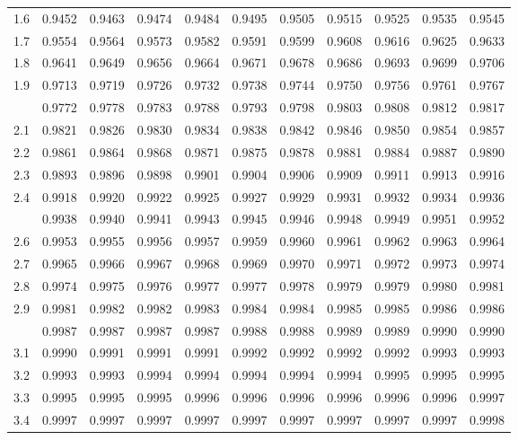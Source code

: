 \documentclass[12pt,a4paper]{article}
\begin{document}
\begin{enumerate}
\begin{center}
\begin{longtable}{ccccccccccc}
1.6 & 0.9452 & 0.9463 & 0.9474 & 0.9484 & 0.9495 & 0.9505 & 0.9515 & 0.9525 & 0.9535 & 0.9545 \\
1.7 & 0.9554 & 0.9564 & 0.9573 & 0.9582 & 0.9591 & 0.9599 & 0.9608 & 0.9616 & 0.9625 & 0.9633 \\
1.8 & 0.9641 & 0.9649 & 0.9656 & 0.9664 & 0.9671 & 0.9678 & 0.9686 & 0.9693 & 0.9699 & 0.9706 \\
1.9 & 0.9713 & 0.9719 & 0.9726 & 0.9732 & 0.9738 & 0.9744 & 0.9750 & 0.9756 & 0.9761 & 0.9767 \\
\addlinespace
2.0 & 0.9772 & 0.9778 & 0.9783 & 0.9788 & 0.9793 & 0.9798 & 0.9803 & 0.9808 & 0.9812 & 0.9817 \\
2.1 & 0.9821 & 0.9826 & 0.9830 & 0.9834 & 0.9838 & 0.9842 & 0.9846 & 0.9850 & 0.9854 & 0.9857 \\
2.2 & 0.9861 & 0.9864 & 0.9868 & 0.9871 & 0.9875 & 0.9878 & 0.9881 & 0.9884 & 0.9887 & 0.9890 \\
2.3 & 0.9893 & 0.9896 & 0.9898 & 0.9901 & 0.9904 & 0.9906 & 0.9909 & 0.9911 & 0.9913 & 0.9916 \\
2.4 & 0.9918 & 0.9920 & 0.9922 & 0.9925 & 0.9927 & 0.9929 & 0.9931 & 0.9932 & 0.9934 & 0.9936 \\
\addlinespace
2.5 & 0.9938 & 0.9940 & 0.9941 & 0.9943 & 0.9945 & 0.9946 & 0.9948 & 0.9949 & 0.9951 & 0.9952 \\
2.6 & 0.9953 & 0.9955 & 0.9956 & 0.9957 & 0.9959 & 0.9960 & 0.9961 & 0.9962 & 0.9963 & 0.9964 \\
2.7 & 0.9965 & 0.9966 & 0.9967 & 0.9968 & 0.9969 & 0.9970 & 0.9971 & 0.9972 & 0.9973 & 0.9974 \\
2.8 & 0.9974 & 0.9975 & 0.9976 & 0.9977 & 0.9977 & 0.9978 & 0.9979 & 0.9979 & 0.9980 & 0.9981 \\
2.9 & 0.9981 & 0.9982 & 0.9982 & 0.9983 & 0.9984 & 0.9984 & 0.9985 & 0.9985 & 0.9986 & 0.9986 \\
\addlinespace
3.0 & 0.9987 & 0.9987 & 0.9987 & 0.9987 & 0.9988 & 0.9988 & 0.9989 & 0.9989 & 0.9990 & 0.9990 \\
3.1 & 0.9990 & 0.9991 & 0.9991 & 0.9991 & 0.9992 & 0.9992 & 0.9992 & 0.9992 & 0.9993 & 0.9993 \\
3.2 & 0.9993 & 0.9993 & 0.9994 & 0.9994 & 0.9994 & 0.9994 & 0.9994 & 0.9995 & 0.9995 & 0.9995 \\
3.3 & 0.9995 & 0.9995 & 0.9995 & 0.9996 & 0.9996 & 0.9996 & 0.9996 & 0.9996 & 0.9996 & 0.9997 \\
3.4 & 0.9997 & 0.9997 & 0.9997 & 0.9997 & 0.9997 & 0.9997 & 0.9997 & 0.9997 & 0.9997 & 0.9998 \\
\end{longtable}
\end{center}


\end{enumerate}
\end{document}
